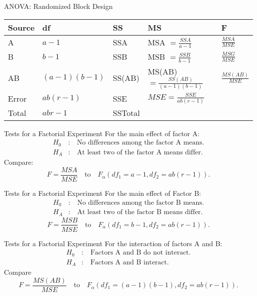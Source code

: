 \begin{frame}{ANOVA: Randomized Block Design}
    \begin{table}[]
        \centering\setlength{\extrarowheight}{12pt}
        \begin{tabular}{lllll}
            \hline
            Source  & df & SS & MS & F \\
            \hline
            A   & $a-1$ & SSA & MSA $= \frac{SSA}{a-1}$ & $\frac{MSA}{MSE}$ \\
            B  & $b-1$ & SSB & MSB $= \frac{SSB}{b-1}$ & $\frac{MSG}{MSE}$ \\
            AB  & $(a-1)(b-1)$ & SS(AB) & MS(AB)$ = \frac{SS(AB)}{(a-1)(b-1)}$ & $\frac{MS(AB)}{MSE}$ \\
            Error   & $ab(r-1)$ & SSE & $MSE =\frac{SSE}{ab(r-1)}$\\
            \hline
            Total   & $abr-1$ & SSTotal \\
            \hline
        \end{tabular}
    \end{table}
\end{frame}

\begin{frame}{Tests for a Factorial Experiment}
    For the main effect of factor A:
    \begin{align*}
       H_0&: \quad \text{No differences among the factor A means.} \\
       H_A&: \quad \text{At least two of the factor A means differ.}
    \end{align*}
    Compare: 
    \[
        F = \frac{MSA}{MSE} \quad\text{to}\quad F_{\alpha}(df_1 = a-1, df_2=ab(r-1)).
    \]
\end{frame}

\begin{frame}{Tests for a Factorial Experiment}
    For the main effect of Factor B:
    \begin{align*}
       H_0&: \quad \text{No differences among the factor B means.} \\
       H_A&: \quad \text{At least two of the factor B means differ.}
    \end{align*}
    \[
        F = \frac{MSB}{MSE} \quad\text{to}\quad F_{\alpha}(df_1 = b-1, df_2=ab(r-1)).
    \]
\end{frame}

\begin{frame}{Tests for a Factorial Experiment}
    For the interaction of factors A and B:
    \begin{align*}
       H_0&: \quad \text{Factors A and B do not interact.} \\
       H_A&: \quad \text{Factors A and B interact.}
    \end{align*}
    Compare
    \[
        F = \frac{MS(AB)}{MSE} \quad\text{to}\quad F_{\alpha}(df_1 = (a-1)(b-1), df_2=ab(r-1)).
    \]
\end{frame}

